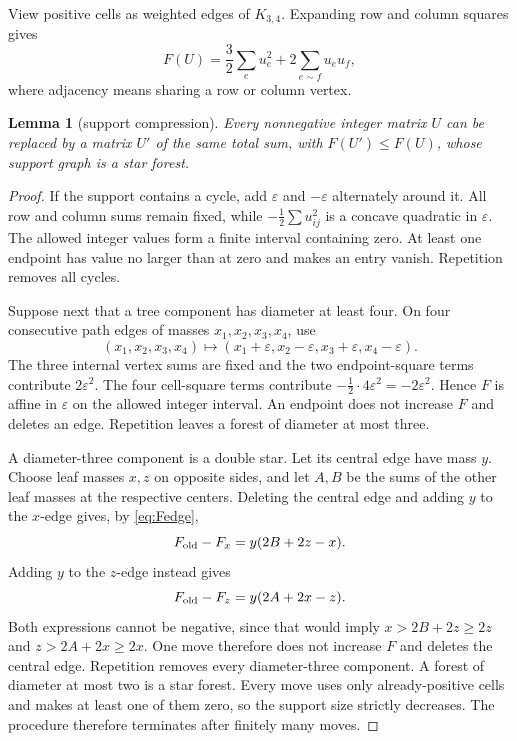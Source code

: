 \documentclass[11pt]{article}
\theoremstyle{plain}
\newtheorem{lemma}[theorem]{Lemma}
\theoremstyle{definition}
\theoremstyle{remark}
\newcommand{\1}{\mathbf 1}
\newcommand{\eps}{\varepsilon}
\begin{document}
View positive cells as weighted edges of $K_{3,4}$.  Expanding row and column
squares gives
\begin{equation}\label{eq:Fedge}
 F(U)=\frac32\sum_eu_e^2+2\sum_{e\sim f}u_eu_f,
\end{equation}
where adjacency means sharing a row or column vertex.

\begin{lemma}[support compression]\label{lem:compression}
Every nonnegative integer matrix $U$ can be replaced by a matrix $U'$ of the
same total sum, with $F(U')\leq F(U)$, whose support graph is a star forest.
\end{lemma}

\begin{proof}
If the support contains a cycle, add $\eps$ and $-\eps$ alternately around it.
All row and column sums remain fixed, while
$-\frac12\sum u_{ij}^2$ is a concave quadratic in $\eps$.  The allowed
integer values form a finite interval containing zero.  At least one endpoint
has value no larger than at zero and makes an entry vanish.  Repetition removes
all cycles.

Suppose next that a tree component has diameter at least four.  On four
consecutive path edges of masses $x_1,x_2,x_3,x_4$, use
\[
 (x_1,x_2,x_3,x_4)\mapsto
 (x_1+\eps,x_2-\eps,x_3+\eps,x_4-\eps).
\]
The three internal vertex sums are fixed and the two endpoint-square terms
contribute $2\eps^2$.  The four cell-square terms contribute
$-\frac12\cdot4\eps^2=-2\eps^2$.  Hence $F$ is affine in $\eps$ on the
allowed integer interval.  An endpoint does not increase $F$ and deletes an
edge.  Repetition leaves a forest of diameter at most three.

A diameter-three component is a double star.  Let its central edge have mass
$y$.  Choose leaf masses $x,z$ on opposite sides, and let $A,B$ be the sums of
the other leaf masses at the respective centers.  Deleting the central edge
and adding $y$ to the $x$-edge gives, by \eqref{eq:Fedge},
\[
 F_{\rm old}-F_x=y(2B+2z-x).
\]
Adding $y$ to the $z$-edge instead gives
\[
 F_{\rm old}-F_z=y(2A+2x-z).
\]
Both expressions cannot be negative, since that would imply
$x>2B+2z\geq2z$ and $z>2A+2x\geq2x$.  One move therefore does not increase
$F$ and deletes the central edge.  Repetition removes every diameter-three
component.  A forest of diameter at most two is a star forest.
Every move uses only already-positive cells and makes at least one of them
zero, so the support size strictly decreases.  The procedure therefore
terminates after finitely many moves.
\end{proof}
\end{document}
